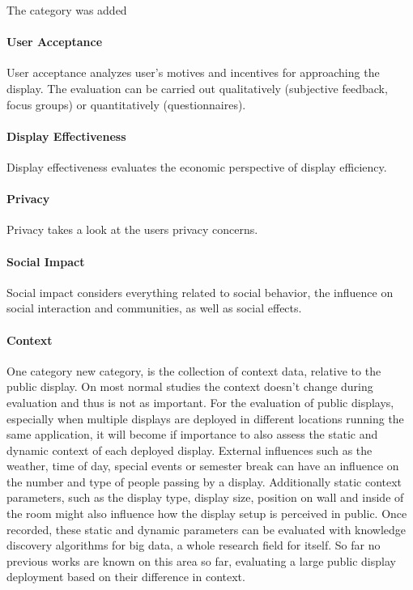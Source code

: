 	The category was added 

	\paragraph{User Acceptance}

		User acceptance analyzes user's motives and incentives for approaching the display. The evaluation can be carried out qualitatively (subjective feedback, focus groups) or quantitatively (questionnaires).

	\paragraph{Display Effectiveness}
		Display effectiveness evaluates the economic perspective of display efficiency. 

	\paragraph{Privacy}
		Privacy takes a look at the users privacy concerns.

	\paragraph{Social Impact}
		Social impact considers everything related to social behavior, the influence on social interaction and communities, as well as social effects.

	\paragraph{Context}

		One category new category, is the collection of context data, relative to the public display. On most normal studies the context doesn't change during evaluation and thus is not as important. For the evaluation of public displays, especially when multiple displays are deployed in different locations running the same application, it will become if importance to also assess the static and dynamic context of each deployed display. External influences such as the weather, time of day, special events or semester break can have an influence on the number and type of people passing by a display. Additionally static context parameters, such as the display type, display size, position on wall and inside of the room might also influence how the display setup is perceived in public. Once recorded, these static and dynamic parameters can be evaluated with knowledge discovery algorithms for big data, a whole research field for itself. 
		So far no previous works are known on this area so far, evaluating a large public display deployment based on their difference in context.

